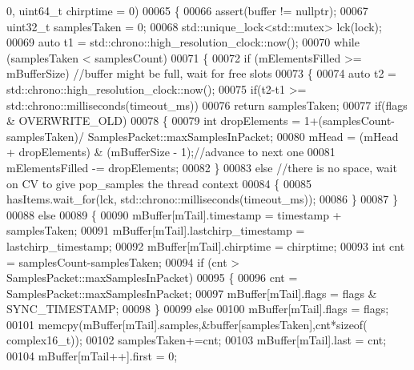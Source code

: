 \begin{DoxyCode}
      0, uint64\_t chirptime  = 0)
00065     \{
00066         assert(buffer != \textcolor{keyword}{nullptr});
00067         uint32\_t samplesTaken = 0;
00068         std::unique\_lock<std::mutex> lck(lock);
00069         \textcolor{keyword}{auto} t1 = std::chrono::high\_resolution\_clock::now();
00070         \textcolor{keywordflow}{while} (samplesTaken < samplesCount)
00071         \{
00072             \textcolor{keywordflow}{if} (mElementsFilled >= mBufferSize) \textcolor{comment}{//buffer might be full, wait for free slots}
00073             \{
00074                 \textcolor{keyword}{auto} t2 = std::chrono::high\_resolution\_clock::now();
00075                 \textcolor{keywordflow}{if}(t2-t1 >= std::chrono::milliseconds(timeout\_ms))
00076                     \textcolor{keywordflow}{return} samplesTaken;
00077                 \textcolor{keywordflow}{if}(flags & OVERWRITE_OLD)
00078                 \{
00079                     \textcolor{keywordtype}{int} dropElements = 1+(samplesCount-samplesTaken)/
      SamplesPacket::maxSamplesInPacket;
00080                     mHead = (mHead + dropElements) & (mBufferSize - 1);\textcolor{comment}{//advance to next one}
00081                     mElementsFilled -= dropElements;
00082                 \}
00083                 \textcolor{keywordflow}{else}  \textcolor{comment}{//there is no space, wait on CV to give pop\_samples the thread context}
00084                 \{
00085                     hasItems.wait\_for(lck, std::chrono::milliseconds(timeout\_ms));
00086                 \}
00087             \}
00088             \textcolor{keywordflow}{else}
00089             \{
00090                 mBuffer[mTail].timestamp = timestamp + samplesTaken;
00091                 mBuffer[mTail].lastchirp_timestamp = lastchirp\_timestamp;
00092                 mBuffer[mTail].chirptime = chirptime;
00093                 \textcolor{keywordtype}{int} cnt = samplesCount-samplesTaken;
00094                 \textcolor{keywordflow}{if} (cnt > SamplesPacket::maxSamplesInPacket)
00095                 \{
00096                     cnt = SamplesPacket::maxSamplesInPacket;
00097                     mBuffer[mTail].flags = flags & SYNC_TIMESTAMP;
00098                 \}
00099                 \textcolor{keywordflow}{else}
00100                     mBuffer[mTail].flags = flags;
00101                 memcpy(mBuffer[mTail].samples,&buffer[samplesTaken],cnt*\textcolor{keyword}{sizeof}(
      complex16_t));
00102                 samplesTaken+=cnt;
00103                 mBuffer[mTail].last = cnt;
00104                 mBuffer[mTail++].first = 0;

\end{DoxyCode}
